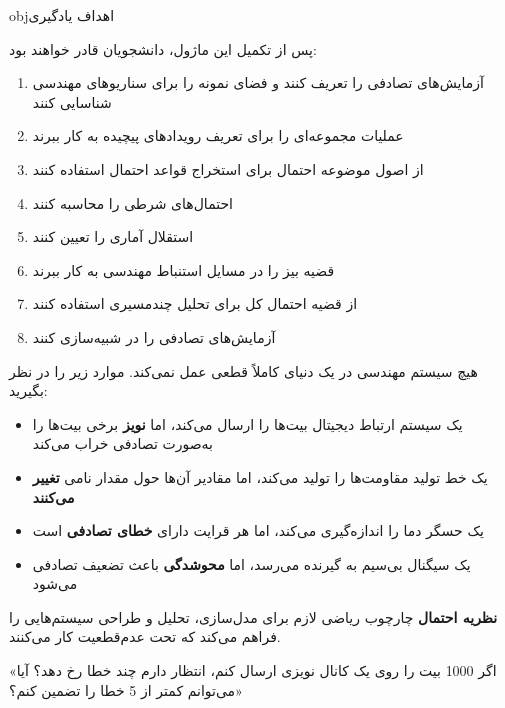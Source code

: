 \begin{PSbox}[unbreakable]{obj}{اهداف یادگیری}

پس از تکمیل این ماژول، دانشجویان قادر خواهند بود:

\begin{enumerate}
\def\labelenumi{\arabic{enumi}.}
\tightlist
\item
  آزمایش‌های تصادفی را تعریف کنند و فضای نمونه را برای سناریوهای مهندسی شناسایی کنند
\item
  عملیات مجموعه‌ای را برای تعریف رویدادهای پیچیده به کار ببرند
\item
  از اصول موضوعه احتمال برای استخراج قواعد احتمال استفاده کنند
\item
  احتمال‌های شرطی را محاسبه کنند
\item
  استقلال آماری را تعیین کنند
\item
  قضیه بیز را در مسایل استنباط مهندسی به کار ببرند
\item
  از قضیه احتمال کل برای تحلیل چندمسیری استفاده کنند
\item
  آزمایش‌های تصادفی را در  شبیه‌سازی کنند
\end{enumerate}

\end{PSbox}



هیچ سیستم مهندسی در یک دنیای کاملاً قطعی عمل نمی‌کند. موارد زیر را در نظر بگیرید:

\begin{itemize}
\tightlist
\item
  یک سیستم ارتباط دیجیتال بیت‌ها را ارسال می‌کند، اما \textbf{نویز} برخی بیت‌ها را به‌صورت تصادفی خراب می‌کند
\item
  یک خط تولید مقاومت‌ها را تولید می‌کند، اما مقادیر آن‌ها حول مقدار نامی \textbf{تغییر می‌کنند}
\item
  یک حسگر دما را اندازه‌گیری می‌کند، اما هر قرایت دارای \textbf{خطای تصادفی} است
\item
  یک سیگنال بی‌سیم به گیرنده می‌رسد، اما \textbf{محو‌شدگی} باعث تضعیف تصادفی می‌شود
\end{itemize}

\textbf{نظریه احتمال} چارچوب ریاضی لازم برای مدل‌سازی، تحلیل و طراحی سیستم‌هایی را فراهم می‌کند که تحت عدم‌قطعیت کار می‌کنند.


\begin{PSquote}

«اگر 1000 بیت را روی یک کانال نویزی ارسال کنم، انتظار دارم چند خطا رخ دهد؟ آیا می‌توانم کمتر از 5 خطا را تضمین کنم؟»

\end{PSquote}

